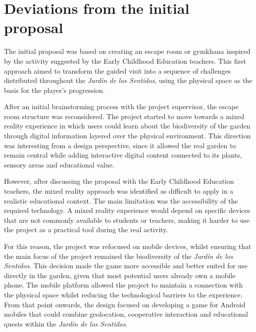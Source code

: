 \section{Deviations from the initial proposal}
The initial proposal was based on creating an escape room or gymkhana inspired by the activity suggested by the Early Childhood Education teachers. This first approach aimed to transform the guided visit into a sequence of challenges distributed throughout the \textit{Jardín de los Sentidos}, using the physical space as the basis for the player’s progression.

After an initial brainstorming process with the project supervisor, the escape room structure was reconsidered. The project started to move towards a mixed reality experience in which users could learn about the biodiversity of the garden through digital information layered over the physical environment. This direction was interesting from a design perspective, since it allowed the real garden to remain central while adding interactive digital content connected to its plants, sensory areas and educational value.

However, after discussing the proposal with the Early Childhood Education teachers, the mixed reality approach was identified as difficult to apply in a realistic educational context. The main limitation was the accessibility of the required technology. A mixed reality experience would depend on specific devices that are not commonly available to students or teachers, making it harder to use the project as a practical tool during the real activity.

For this reason, the project was refocused on mobile devices, whilst ensuring that the main focus of the project remained the biodiversity of the \textit{Jardín de los Sentidos}. This decision made the game more accessible and better suited for use directly in the garden, given that most potential users already own a mobile phone. The mobile platform allowed the project to maintain a connection with the physical space whilst reducing the technological barriers to the experience. From that point onwards, the design focused on developing a game for Android mobiles that could combine geolocation, cooperative interaction and educational quests within the \textit{Jardín de los Sentidos}.

